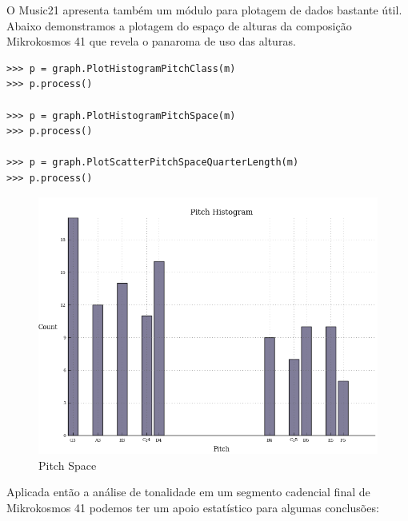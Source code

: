 \documentclass[
	12pt,				%
	openright,			%
	twoside,			%
	a4paper,			%
	english,			%
	french,				%
	spanish,			%
	brazil				%
	]{abntex2}
\begin{document}
O Music21 apresenta também um módulo para plotagem de dados bastante útil. Abaixo demonstramos a plotagem do espaço de alturas da composição Mikrokosmos 41 que revela o panaroma de uso das alturas.


\begin{lstlisting}
>>> p = graph.PlotHistogramPitchClass(m)
>>> p.process()

>>> p = graph.PlotHistogramPitchSpace(m)
>>> p.process()

>>> p = graph.PlotScatterPitchSpaceQuarterLength(m)
>>> p.process()

\end{lstlisting}


\begin{figure}[!h]
	\caption{\label{fig_grafico} Pitch Space} 
	\begin{center}
	    \includegraphics[scale=0.4]{estudosM21/mikro041Pspace.png}
	\end{center}
\end{figure}


Aplicada então a análise de tonalidade em um segmento cadencial final de Mikrokosmos 41 podemos ter um apoio estatístico para algumas conclusões:
\end{document}
